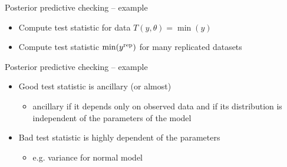 \documentclass[t]{beamer}
\begin{document}
\begin{frame}{Posterior predictive checking -- example}

  \begin{itemize}
  \item<1-> Compute test statistic for data $T(y,\theta)=\min(y)$
  \item<2-> Compute test statistic $\min(y^{\rm rep})$ for many replicated datasets 
  \end{itemize}
  \vspace{-1.5\baselineskip}

\end{frame}

\begin{frame}{Posterior predictive checking -- example}

  \begin{itemize}
  \item<1-> Good test statistic is ancillary (or almost)
    \begin{itemize}
    \item ancillary if it depends only on observed data and if its
      distribution is independent of the parameters of the model
    \end{itemize}
  \item<2-> Bad test statistic is highly dependent of the parameters
    \begin{itemize}
    \item e.g. variance for normal model
    \end{itemize}
  \end{itemize}
  \vspace{-1.5\baselineskip}

\end{frame}
\end{document}
